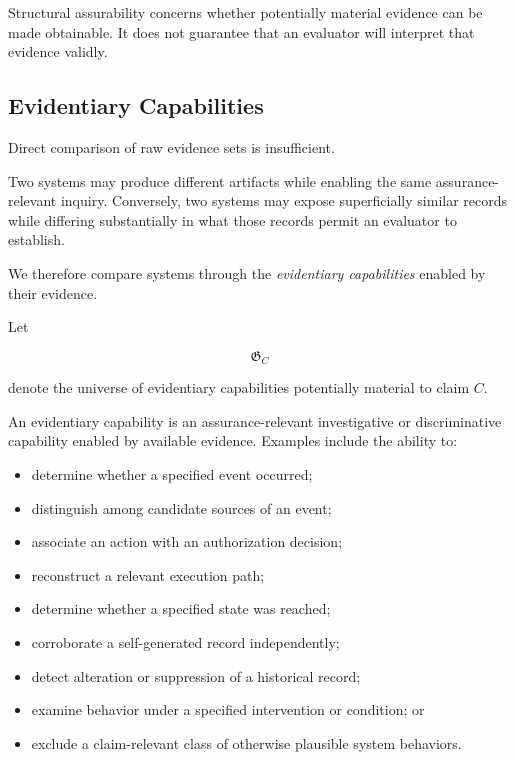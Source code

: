 Structural assurability concerns whether potentially material evidence can be made obtainable.
It does not guarantee that an evaluator will interpret that evidence validly.

\subsection{Evidentiary Capabilities}
\label{aa.subsec.evidentiary-capabilities}

Direct comparison of raw evidence sets is insufficient.

Two systems may produce different artifacts while enabling the same assurance-relevant inquiry.
Conversely, two systems may expose superficially similar records while differing substantially
in what those records permit an evaluator to establish.

We therefore compare systems through the \emph{evidentiary capabilities} enabled by their evidence.

Let

\begin{equation}
  \mathfrak{G}_C
\end{equation}

denote the universe of evidentiary capabilities potentially material to claim \(C\).

An evidentiary capability is an assurance-relevant
investigative or discriminative capability enabled by available evidence.
Examples include the ability to:

\begin{itemize}
  \item determine whether a specified event occurred;
  \item distinguish among candidate sources of an event;
  \item associate an action with an authorization decision;
  \item reconstruct a relevant execution path;
  \item determine whether a specified state was reached;
  \item corroborate a self-generated record independently;
  \item detect alteration or suppression of a historical record;
  \item examine behavior under a specified intervention or condition; or
  \item exclude a claim-relevant class of otherwise plausible system behaviors.
\end{itemize}

